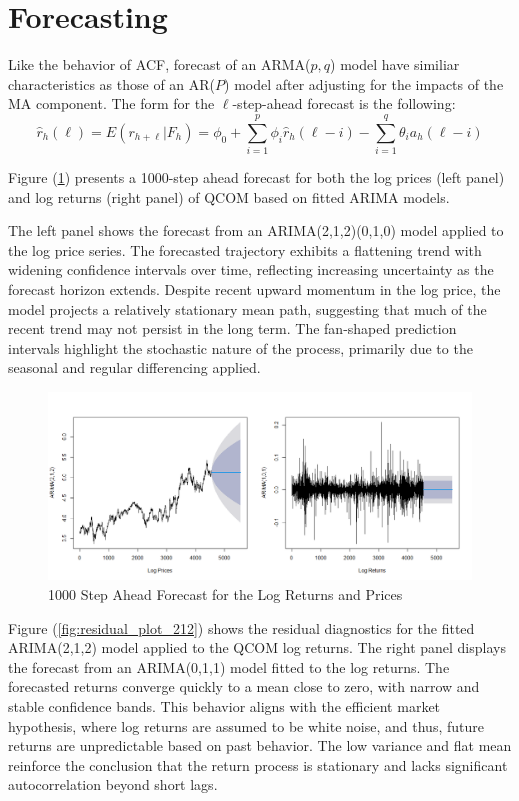 \section{Forecasting}

Like the behavior of ACF, forecast of an ARMA($p,q$) model have similiar characteristics as those of an AR($P$) model after adjusting for the impacts of the MA component. The form for the $\ell$-step-ahead forecast is the following:
\begin{equation}
	\hat{r}_h(\ell)=E(r_{h+\ell}|F_h)=\phi_0+\sum_{i=1}^{p}\phi_i\hat{r}_h(\ell-i)-\sum_{i=1}^{q}\theta_ia_h(\ell-i)
\end{equation}

Figure (\ref{fig:forecast}) presents a 1000-step ahead forecast for both the log prices (left panel) and log returns (right panel) of QCOM based on fitted ARIMA models.

The left panel shows the forecast from an ARIMA(2,1,2)(0,1,0) model applied to the log price series. The forecasted trajectory exhibits a flattening trend with widening confidence intervals over time, reflecting increasing uncertainty as the forecast horizon extends. Despite recent upward momentum in the log price, the model projects a relatively stationary mean path, suggesting that much of the recent trend may not persist in the long term. The fan-shaped prediction intervals highlight the stochastic nature of the process, primarily due to the seasonal and regular differencing applied.

\begin{figure}[h]
	\centering
	\includegraphics[width=1\linewidth]{content/plots/forecast.png}
	\caption{1000 Step Ahead Forecast for the Log Returns and Prices}
	\label{fig:forecast}
\end{figure}

Figure (\ref{fig:residual_plot_212}) shows the residual diagnostics for the fitted ARIMA(2,1,2) model applied to the QCOM log returns. The right panel displays the forecast from an ARIMA(0,1,1) model fitted to the log returns. The forecasted returns converge quickly to a mean close to zero, with narrow and stable confidence bands. This behavior aligns with the efficient market hypothesis, where log returns are assumed to be white noise, and thus, future returns are unpredictable based on past behavior. The low variance and flat mean reinforce the conclusion that the return process is stationary and lacks significant autocorrelation beyond short lags.

